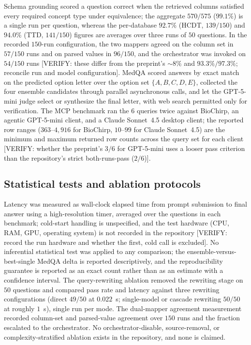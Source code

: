Schema grounding scored a question correct when the retrieved columns satisfied every required concept type under equivalence; the aggregate $570/575$ ($99.1\%$) is a single run per question, whereas the per-database $92.7\%$ (HCDT, $139/150$) and $94.0\%$ (TTD, $141/150$) figures are averages over three runs of $50$ questions. In the recorded $150$-run configuration, the two mappers agreed on the column set in $57/150$ runs and on parsed values in $96/150$, and the orchestrator was invoked on $54/150$ runs [VERIFY: these differ from the preprint's $\sim\!8\%$ and $93.3\%/97.3\%$; reconcile run and model configuration]. MedQA scored answers by exact match on the predicted option letter over the option set $\{A,B,C,D,E\}$, collected the four ensemble candidates through parallel asynchronous calls, and let the GPT-5-mini judge select or synthesize the final letter, with web search permitted only for verification. The MCP benchmark ran the $6$ queries twice against BioChirp, an agentic GPT-5-mini client, and a Claude Sonnet~4.5 desktop client; the reported row ranges ($363$--$4{,}916$ for BioChirp, $10$--$99$ for Claude Sonnet~4.5) are the minimum and maximum returned row counts across the query set for each client [VERIFY: whether the preprint's $3/6$ for GPT-5-mini uses a looser pass criterion than the repository's strict both-runs-pass ($2/6$)].

\subsection*{Statistical tests and ablation protocols}

Latency was measured as wall-clock elapsed time from prompt submission to final answer using a high-resolution timer, averaged over the questions in each benchmark; cold-start handling is unspecified, and the test hardware (CPU, RAM, GPU, operating system) is not recorded in the repository [VERIFY: record the run hardware and whether the first, cold call is excluded]. No inferential statistical test was applied to any comparison; the ensemble-versus-best-single MedQA delta is reported descriptively, and the reproducibility guarantee is reported as an exact count rather than as an estimate with a confidence interval. The query-rewriting ablation removed the rewriting stage on $50$ questions and compared pass rate and latency against three rewriting configurations (direct $49/50$ at $0.022$~s; single-model or cascade rewriting $50/50$ at roughly $1$~s), single run per mode. The dual-mapper agreement measurement recorded column-set and parsed-value agreement over $150$ runs and the fraction escalated to the orchestrator. No orchestrator-disable, source-removal, or complexity-stratified ablation exists in the repository, and none is claimed.

